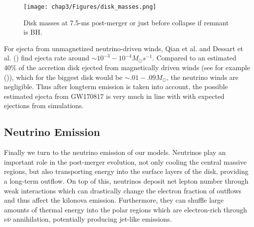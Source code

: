 
\begin{figure}[!htbp]
  \centering
\texttt{[image: chap3/Figures/disk\_masses.png]}
\caption{
  Disk masses at 7.5-ms post-merger or just before collapse if remnant is BH.
}
\label{fig:disk_masses}
\end{figure}

For ejecta from unmagnetized neutrino-driven winds, Qian et al. and Dessart et al. (\cite{qian1996nucleosynthesis,dessart2009}) find ejecta rate around $\sim 10^{-3} - 10^{-4}M_\odot s^{-1}$. Compared to an estimated $40\%$ of the accretion disk ejected from magnetically driven winds (see for example (\cite{fernandez2019long})), which for the biggest disk would be $\sim .01-.09M_\odot$, the neutrino winds are negligible. Thus after longterm emission is taken into account, the possible estimated ejecta from GW170817 is very much in line with with expected ejections from simulations.

\subsection{Neutrino Emission}
%
Finally we turn to the neutrino emission of our models. Neutrinos play an important role in the post-merger evolution, not only cooling the central massive regions, but also transporting energy into the surface layers of the disk, providing a long-term outflow. On top of this, neutrinos deposit net lepton number through weak interactions which can drastically change the electron fraction of outflows and thus affect the kilonova emission. Furthermore, they can shuffle large amounts of thermal energy into the polar regions which are electron-rich through $\nu\bar\nu$ annihilation, potentially producing jet-like emissions.

